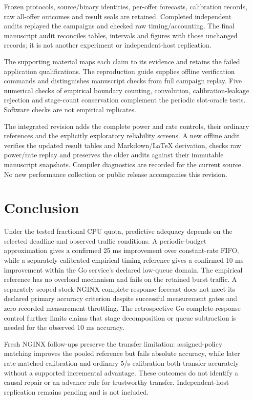 \documentclass[11pt,a4paper]{article}
\begin{document}
Frozen protocols, source/binary identities, per-offer forecasts, calibration
records, raw all-offer outcomes and result seals are retained. Completed
independent audits replayed the campaigns and checked raw timing/accounting.
The final manuscript audit reconciles tables, intervals and figures with those
unchanged records; it is not another experiment or independent-host replication.

The supporting material maps each
claim to its evidence and retains the failed application qualifications. The
reproduction guide supplies offline
verification commands and distinguishes manuscript checks from full campaign
replay. Five numerical checks of empirical boundary counting, convolution,
calibration-leakage rejection and stage-count conservation complement the
periodic slot-oracle tests. Software checks are not empirical replicates.

The integrated revision adds the complete power and rate controls, their ordinary
references and the explicitly exploratory reliability screens. A new offline
audit verifies the updated result tables and Markdown/LaTeX derivation, checks
raw power/rate replay and preserves the older audits against their immutable
manuscript snapshots. Compiler diagnostics are recorded for the current source.
No new performance collection or public release accompanies this revision.

\section{Conclusion}

Under the tested fractional CPU quota, predictive adequacy depends on the
selected deadline and observed traffic conditions. A periodic-budget
approximation gives a confirmed 25 ms improvement over constant-rate FIFO,
while a separately calibrated empirical timing reference gives a confirmed
10 ms improvement within the Go service's declared low-queue domain. The
empirical reference has no overload mechanism and fails on the retained burst
traffic. A separately scoped stock-NGINX complete-response forecast does not
meet its declared primary accuracy criterion despite successful measurement
gates and zero recorded measurement throttling. The retrospective Go
complete-response control further limits claims that stage decomposition or
queue subtraction is needed for the observed 10 ms accuracy.

Fresh NGINX follow-ups preserve the transfer limitation: assigned-policy matching
improves the pooled reference but fails absolute accuracy, while later rate-matched
calibration and ordinary 5/s calibration both transfer accurately without a
supported incremental advantage. These outcomes do not identify a causal repair
or an advance rule for trustworthy transfer. Independent-host replication remains
pending and is not included.
\end{document}

